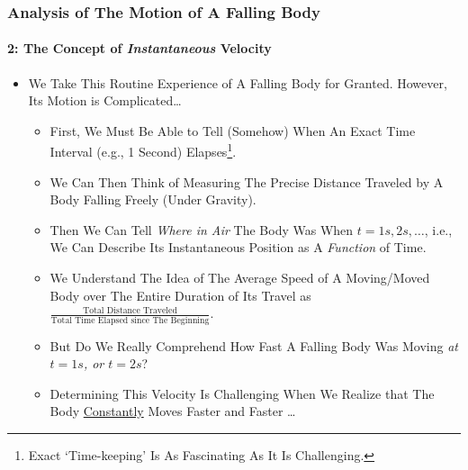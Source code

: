 \begin{frame}
\frametitle{Analysis of The Motion of \alert{A Falling Body}}
\framesubtitle{2: The Concept of \textit{Instantaneous} Velocity}
\label{slide:analysis-of-falling-body-2}
\begin{itemize}
\pause
\item We Take This Routine Experience of A Falling Body for Granted. However, Its Motion is Complicated\dots
\begin{itemize}
\pause
\item First, We Must Be Able to Tell (Somehow) When An Exact Time Interval (e.g., 1 Second) Elapses\footnote{\tiny Exact `Time-keeping' Is As Fascinating As It Is Challenging.}.
\pause
\item We Can Then Think of Measuring The Precise Distance Traveled by A Body Falling Freely (Under Gravity).
\pause
\item Then We Can Tell \textit{Where in Air} The Body Was When $t=1s,2s,\dots$, i.e., We Can Describe Its \alert{Instantaneous Position as A \textit{Function} of Time}.
\pause
\item We Understand The Idea of The \alert{Average Speed of A Moving/Moved Body over The Entire Duration of Its Travel} as $\frac{\text{Total Distance Traveled}}{{\text{Total Time Elapsed since The Beginning}}}$.
\pause
\item But Do We Really Comprehend \alert{How Fast A Falling Body Was Moving \textit{at $t=1s$, or $t=2s$}}?
\pause
\item Determining This Velocity Is Challenging When We Realize that \alert{The Body \underline{Constantly} Moves Faster and Faster \dots}
\end{itemize}
\end{itemize}
\end{frame}
